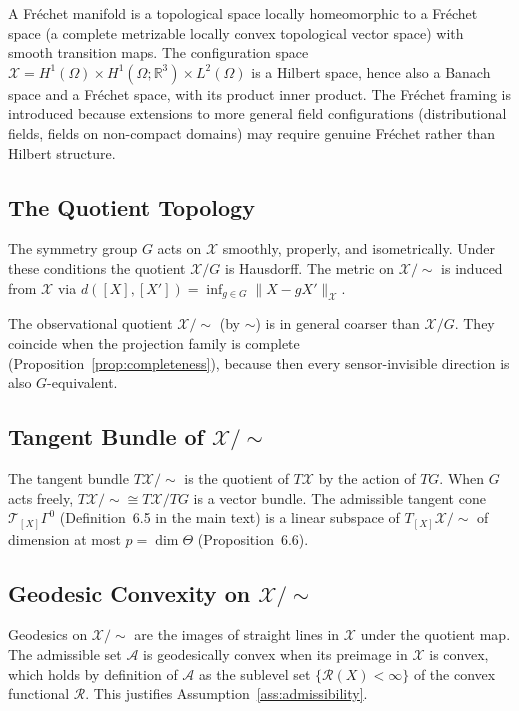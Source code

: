 \documentclass[11pt, oneside]{article}
\newcommand{\Xmod}{\mathcal{X}/{\sim}}
\begin{document}
A Fréchet manifold is a topological space locally homeomorphic to a Fréchet space (a
complete metrizable locally convex topological vector space) with smooth transition maps.
The configuration space $\mathcal{X} = H^1(\Omega) \times H^1(\Omega;\mathbb{R}^3) \times
L^2(\Omega)$ is a Hilbert space, hence also a Banach space and a Fréchet space, with its
product inner product. The Fréchet framing is introduced because extensions to more
general field configurations (distributional fields, fields on non-compact domains) may
require genuine Fréchet rather than Hilbert structure.

\subsection{The Quotient Topology}

The symmetry group $G$ acts on $\mathcal{X}$ smoothly, properly, and isometrically.
Under these conditions the quotient $\mathcal{X}/G$ is Hausdorff. The metric on $\Xmod$
is induced from $\mathcal{X}$ via $d([X],[X']) = \inf_{g \in G} \|X - gX'\|_{\mathcal{X}}$.

The observational quotient $\Xmod$ (by $\sim$) is in general coarser than $\mathcal{X}/G$.
They coincide when the projection family is complete (Proposition~\ref{prop:completeness}),
because then every sensor-invisible direction is also $G$-equivalent.

\subsection{Tangent Bundle of $\Xmod$}

The tangent bundle $T\Xmod$ is the quotient of $T\mathcal{X}$ by the action of $TG$. When
$G$ acts freely, $T\Xmod \cong T\mathcal{X}/TG$ is a vector bundle. The admissible tangent
cone $\mathcal{T}_{[X]}\Gamma^0$ (Definition~6.5 in the main text) is a linear subspace
of $T_{[X]}\Xmod$ of dimension at most $p = \dim\Theta$ (Proposition~6.6).

\subsection{Geodesic Convexity on $\Xmod$}

Geodesics on $\Xmod$ are the images of straight lines in $\mathcal{X}$ under the
quotient map. The admissible set $\mathcal{A}$ is geodesically convex when its preimage
in $\mathcal{X}$ is convex, which holds by definition of $\mathcal{A}$ as the
sublevel set $\{\mathcal{R}(X) < \infty\}$ of the convex functional $\mathcal{R}$.
This justifies Assumption~\ref{ass:admissibility}.
\end{document}
